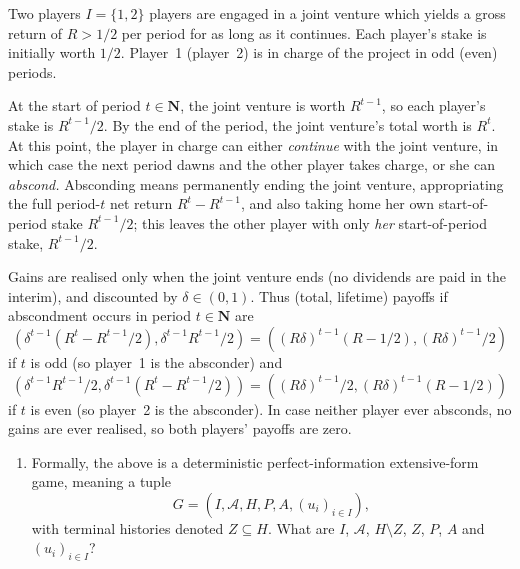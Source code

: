 \begin{exercise}
	\label{exercise:joint_venutre}
	Two players $I=\{1,2\}$ players are engaged in a joint venture which yields a gross return of $R > 1/2$ per period for as long as it continues. Each player's stake is initially worth $1/2$. Player~1 (player~2) is in charge of the project in odd (even) periods.

	At the start of period $t \in \mathbf{N}$, the joint venture is worth $R^{t-1}$, so each player's stake is $R^{t-1}/2$. By the end of the period, the joint venture's total worth is $R^t$. At this point, the player in charge can either \emph{continue} with the joint venture, in which case the next period dawns and the other player takes charge, or she can \emph{abscond.} Absconding means permanently ending the joint venture, appropriating the full period-$t$ net return $R^t - R^{t-1}$, and also taking home her own start-of-period stake $R^{t-1}/2$; this leaves the other player with only \emph{her} start-of-period stake, $R^{t-1}/2$.

	Gains are realised only when the joint venture ends (no dividends are paid in the interim), and discounted by $\delta \in (0,1)$. Thus (total, lifetime) payoffs if abscondment occurs in period $t \in \mathbf{N}$ are
	\begin{equation*}
		\left( \delta^{t-1} \left( R^t - R^{t-1}/2 \right), \delta^{t-1} R^{t-1}/2 \right)
		= \left( (R\delta)^{t-1} (R-1/2), (R\delta)^{t-1}/2 \right)
	\end{equation*}
	if $t$ is odd (so player~1 is the absconder) and
	\begin{equation*}
		\left( \delta^{t-1} R^{t-1}/2, \delta^{t-1} \left( R^t - R^{t-1}/2 \right) \right)
		= \left( (R\delta)^{t-1}/2, (R\delta)^{t-1} (R-1/2) \right)
	\end{equation*}
	if $t$ is even (so player~2 is the absconder). In case neither player ever absconds, no gains are ever realised, so both players' payoffs are zero.

	\begin{enumerate}[label=(\alph*)]

		\item Formally, the above is a deterministic perfect-information extensive-form game, meaning a tuple
		\begin{equation*}
			G = (I,\mathcal{A},H,P,A,(u_i)_{i \in I}) ,
		\end{equation*}
		with terminal histories denoted $Z \subseteq H$.
		What are $I$, $\mathcal{A}$, $H \setminus Z$, $Z$, $P$, $A$ and $(u_i)_{i \in I}$?


\end{enumerate}
\end{exercise}
